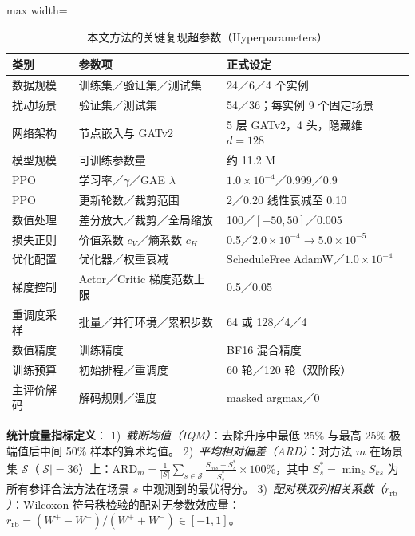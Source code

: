 \documentclass[journal,10pt]{IEEEtran}
\renewcommand{\arraystretch}{1.04}
\begin{document}
\begin{table}[!t]
\centering
\caption{本文方法的关键复现超参数（Hyperparameters）}
\label{tab:reproducibility}
\setlength{\tabcolsep}{2.5pt}
\renewcommand{\arraystretch}{0.92}
\begin{adjustbox}{max width=\columnwidth}
\begin{tabular}{@{}llp{4.2cm}@{}}
\toprule
\textbf{类别} & \textbf{参数项} & \textbf{正式设定} \\
\midrule
数据规模 & 训练集／验证集／测试集 & 24／6／4 个实例 \\
扰动场景 & 验证集／测试集 & 54／36；每实例 9 个固定场景 \\
网络架构 & 节点嵌入与 GATv2 & 5 层 GATv2，4 头，隐藏维 $d=128$ \\
模型规模 & 可训练参数量 & 约 11.2 M \\
PPO & 学习率／$\gamma$／GAE $\lambda$ & $1.0\times10^{-4}$／0.999／0.9 \\
PPO & 更新轮数／裁剪范围 & 2／0.20 线性衰减至 0.10 \\
数值处理 & 差分放大／裁剪／全局缩放 & 100／$[-50,50]$／0.005 \\
损失正则 & 价值系数 $c_V$／熵系数 $c_H$ & 0.5／$2.0\times10^{-4}\to 5.0\times10^{-5}$ \\
优化配置 & 优化器／权重衰减 & ScheduleFree AdamW／$1.0\times10^{-4}$ \\
梯度控制 & Actor／Critic 梯度范数上限 & 0.5／0.05 \\
重调度采样 & 批量／并行环境／累积步数 & 64 或 128／4／4 \\
数值精度 & 训练精度 & BF16 混合精度 \\
训练预算 & 初始排程／重调度 & 60 轮／120 轮（双阶段） \\
主评价解码 & 解码规则／温度 & masked argmax／0 \\
\bottomrule
\end{tabular}
\end{adjustbox}
\end{table}

\textbf{统计度量指标定义}：
1)~\textit{截断均值（IQM）}：去除升序中最低 25\% 与最高 25\% 极端值后中间 50\% 样本的算术均值。
2)~\textit{平均相对偏差（ARD）}：对方法 $m$ 在场景集 $\mathcal S$（$|\mathcal S|=36$）上：$\mathrm{ARD}_m = \frac{1}{|\mathcal S|}\sum_{s\in\mathcal S} \frac{S_{ms}-S_s^*}{S_s^*}\times100\%$，其中 $S_s^*=\min_k S_{ks}$ 为所有参评合法方法在场景 $s$ 中观测到的最优得分。
3)~\textit{配对秩双列相关系数（$r_{\mathrm{rb}}$）}：Wilcoxon 符号秩检验的配对无参数效应量：$r_{\mathrm{rb}}=(W^+-W^-)/(W^++W^-)\in[-1,1]$。
\end{document}
